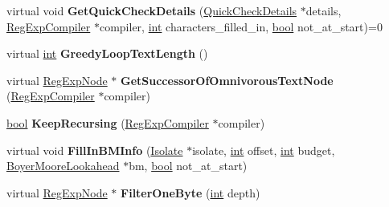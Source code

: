 \begin{DoxyCompactItemize}
\item 
\mbox{\label{classv8_1_1internal_1_1RegExpNode_add5e1fa780c60d5b3a910c00ed713ff6}} 
virtual void {\bfseries Get\+Quick\+Check\+Details} (\mbox{\hyperlink{classv8_1_1internal_1_1QuickCheckDetails}{Quick\+Check\+Details}} $\ast$details, \mbox{\hyperlink{classv8_1_1internal_1_1RegExpCompiler}{Reg\+Exp\+Compiler}} $\ast$compiler, \mbox{\hyperlink{classint}{int}} characters\+\_\+filled\+\_\+in, \mbox{\hyperlink{classbool}{bool}} not\+\_\+at\+\_\+start)=0
\item 
\mbox{\label{classv8_1_1internal_1_1RegExpNode_aa7f55d54a0ffe45d303773b96ac5ef68}} 
virtual \mbox{\hyperlink{classint}{int}} {\bfseries Greedy\+Loop\+Text\+Length} ()
\item 
\mbox{\label{classv8_1_1internal_1_1RegExpNode_a3e648c04dbac6ee8045e8aeeafeb905e}} 
virtual \mbox{\hyperlink{classv8_1_1internal_1_1RegExpNode}{Reg\+Exp\+Node}} $\ast$ {\bfseries Get\+Successor\+Of\+Omnivorous\+Text\+Node} (\mbox{\hyperlink{classv8_1_1internal_1_1RegExpCompiler}{Reg\+Exp\+Compiler}} $\ast$compiler)
\item 
\mbox{\label{classv8_1_1internal_1_1RegExpNode_a409f7d70b3e445a4ba65606759a3fa14}} 
\mbox{\hyperlink{classbool}{bool}} {\bfseries Keep\+Recursing} (\mbox{\hyperlink{classv8_1_1internal_1_1RegExpCompiler}{Reg\+Exp\+Compiler}} $\ast$compiler)
\item 
\mbox{\label{classv8_1_1internal_1_1RegExpNode_a208754eba18d54c32d3d047c851d52f7}} 
virtual void {\bfseries Fill\+In\+B\+M\+Info} (\mbox{\hyperlink{classv8_1_1internal_1_1Isolate}{Isolate}} $\ast$isolate, \mbox{\hyperlink{classint}{int}} offset, \mbox{\hyperlink{classint}{int}} budget, \mbox{\hyperlink{classv8_1_1internal_1_1BoyerMooreLookahead}{Boyer\+Moore\+Lookahead}} $\ast$bm, \mbox{\hyperlink{classbool}{bool}} not\+\_\+at\+\_\+start)
\item 
\mbox{\label{classv8_1_1internal_1_1RegExpNode_af7be8be6f2b52a02345624604a236310}} 
virtual \mbox{\hyperlink{classv8_1_1internal_1_1RegExpNode}{Reg\+Exp\+Node}} $\ast$ {\bfseries Filter\+One\+Byte} (\mbox{\hyperlink{classint}{int}} depth)

\end{DoxyCompactItemize}

